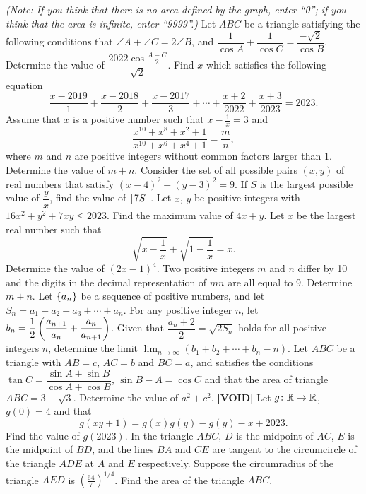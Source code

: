 \begin{enumerate}
    \textit{(Note: If you think that there is no area defined by the graph, enter ``0''; if you think that the area is infinite, enter ``9999''.)}
    \hyperrefitem[A::2023-O-1-11] Let $ABC$ be a triangle satisfying the following conditions that $\angle A + \angle C = 2\angle B$, and $\dfrac1{\cos A} + \dfrac1{\cos C} = \dfrac{-\sqrt2}{\cos B}$. Determine the value of $\dfrac{2022\cos{\frac{A-C}{2}}}{\sqrt2}$.
    \hyperrefitem[A::2023-O-1-12] Find $x$ which satisfies the following equation \[\dfrac{x-2019}{1} + \dfrac{x-2018}{2} + \dfrac{x-2017}{3} + \cdots + \dfrac{x+2}{2022} + \dfrac{x+3}{2023} = 2023.\]
    \hyperrefitem[A::2023-O-1-13] Assume that $x$ is a positive number such that $x - \frac1x = 3$ and \[\dfrac{x^{10} + x^8 + x^2 + 1}{x^{10} + x^6 + x^4 + 1} = \dfrac{m}{n},\] where $m$ and $n$ are positive integers without common factors larger than 1. Determine the value of $m + n$.
    \hyperrefitem[A::2023-O-1-14] Consider the set of all possible pairs $(x, y)$ of real numbers that satisfy $(x-4)^2 + (y-3)^2 = 9$. If $S$ is the largest possible value of $\dfrac{y}{x}$, find the value of $\left\lfloor 7S \right\rfloor$.
    \hyperrefitem[A::2023-O-1-15] Let $x$, $y$ be positive integers with $16x^2 + y^2 + 7xy \leq 2023$. Find the maximum value of $4x + y$.
    \hyperrefitem[A::2023-O-1-16] Let $x$ be the largest real number such that \[\sqrt{x - \dfrac1x} + \sqrt{1 - \dfrac1x} = x.\] Determine the value of $(2x-1)^4$.
    \hyperrefitem[A::2023-O-1-17] Two positive integers $m$ and $n$ differ by 10 and the digits in the decimal representation of $mn$ are all equal to 9. Determine $m + n$.
    \hyperrefitem[A::2023-O-1-18] Let $\left\lbrace a_n \right\rbrace$ be a sequence of positive numbers, and let $S_n = a_1 + a_2 + a_3 + \cdots + a_n$. For any positive integer $n$, let $b_n = \dfrac12 \left( \dfrac{a_{n+1}}{a_n} + \dfrac{a_n}{a_{n+1}} \right)$. Given that $\dfrac{a_n + 2}{2} = \sqrt{2S_n}$ holds for all positive integers $n$, determine the limit $\lim_{n \to \infty} (b_1 + b_2 + \cdots + b_n - n)$.
    \hyperrefitem[A::2023-O-1-19] Let $ABC$ be a triangle with $AB = c$, $AC = b$ and $BC = a$, and satisfies the conditions $\tan C = \dfrac{\sin A + \sin B}{\cos A + \cos B}$, $\sin{B - A} = \cos C$ and that the area of triangle $ABC = 3 + \sqrt{3}$. Determine the value of $a^2 + c^2$.
    \hyperrefitem[A::2023-O-1-20] \textbf{[VOID]} Let $g \colon \mathbb{R} \to \mathbb{R}$, $g(0) = 4$ and that \[g(xy + 1) = g(x)g(y) - g(y) - x + 2023.\] Find the value of $g(2023)$. 
    \hyperrefitem[A::2023-O-1-21] In the triangle $ABC$, $D$ is the midpoint of $AC$, $E$ is the midpoint of $BD$, and the lines $BA$ and $CE$ are tangent to the circumcircle of the triangle $ADE$ at $A$ and $E$ respectively. Suppose the circumradius of the triangle $AED$ is $(\frac{64}{7})^{1/4}$. Find the area of the triangle $ABC$.

\end{enumerate}
